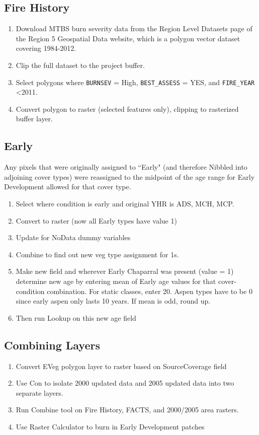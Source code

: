 \subsection{Fire History} 
\begin{enumerate}
\item Download MTBS burn severity data from the Region Level Datasets page of the Region 5 Geospatial Data website, which is a polygon vector dataset covering 1984-2012.
\item Clip the full dataset to the project buffer.
\item Select polygons where \lstinline{BURNSEV} = High, \lstinline{BEST_ASSESS} = YES, and \lstinline{FIRE_YEAR} \textless 2011.
\item Convert polygon to raster (selected features only), clipping to rasterized buffer layer.
\end{enumerate}


\subsection{Early} Any pixels that were originally assigned to ``Early" (and therefore Nibbled into adjoining cover types) were reassigned to the midpoint of the age range for Early Development allowed for that cover type.
\begin{enumerate}
    \item Select where condition is early and original YHR is ADS, MCH, MCP.
    \item Convert to raster (now all Early types have value 1)
    \item Update for NoData dummy variables
    \item Combine to find out new veg type assignment for 1s.
    \item Make new field and wherever Early Chaparral was present (value = 1) determine new age by entering mean of Early age values for that cover-condition combination. For static classes, enter 20. Aspen types have to be 0 since early aspen only lasts 10 years. If mean is odd, round up.
    \item Then run Lookup on this new age field 
\end{enumerate}

\subsection{Combining Layers}
\begin{enumerate}
\item Convert EVeg polygon layer to raster based on SourceCoverage field
\item Use Con to isolate 2000 updated data and 2005 updated data into two separate layers.
\item Run Combine tool on Fire History, FACTS, and 2000/2005 area rasters.
\item Use Raster Calculator to burn in Early Development patches
\end{enumerate}

